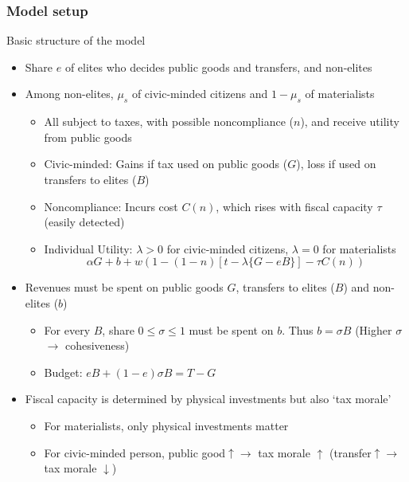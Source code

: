 \documentclass[aspectratio=169]{beamer}
\begin{document}
\begin{frame}
\frametitle{Model setup} 
Basic structure of the model
\begin{itemize}\setlength\itemsep{3pt}
\item Share $e$ of elites who decides public goods and transfers, and non-elites
\item Among non-elites, $\mu_s$ of civic-minded citizens and $1-\mu_s$ of materialists
\begin{itemize}\setlength\itemsep{3pt}
\item All subject to taxes, with possible noncompliance ($n$), and receive utility from public goods 
\item Civic-minded: Gains if tax used on public goods ($G$), loss if used on transfers to elites ($B$)
\item Noncompliance: Incurs cost $C(n)$, which rises with fiscal capacity $\tau$ (easily detected)
\item Individual Utility: $\lambda>0$ for civic-minded citizens, $\lambda=0$ for materialists\vspace{-5pt}
\[\alpha G + b + w(1-(1-n)[t-\lambda\{G-eB\}] -\tau C(n))\] 
\end{itemize}\vspace{-10pt}
\item Revenues must be spent on public goods $G$, transfers to elites ($B$) and non-elites ($b$)
\begin{itemize}\setlength\itemsep{3pt}
\item For every $B$, share $0\leq\sigma\leq1$ must be spent on $b$. Thus $b=\sigma B$  (Higher $\sigma$ $\to$ cohesiveness)
\item Budget: $eB+(1-e)\sigma B = T-G $
\end{itemize}
\item Fiscal capacity is determined by physical investments but also `tax morale'
\begin{itemize}\setlength\itemsep{3pt}
  \item For materialists, only physical investments matter
\item For civic-minded person, public good$\uparrow \to$ tax morale $\uparrow$ (transfer$\uparrow\to$ tax morale $\downarrow$)  
\end{itemize}
\end{itemize}
\end{frame}
\end{document}
